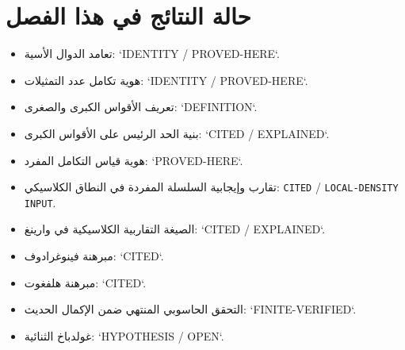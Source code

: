 \section*{حالة النتائج في هذا الفصل}

\begin{itemize}
\item تعامد الدوال الأسية: `IDENTITY / PROVED-HERE`.
\item هوية تكامل عدد التمثيلات: `IDENTITY / PROVED-HERE`.
\item تعريف الأقواس الكبرى والصغرى: `DEFINITION`.
\item بنية الحد الرئيس على الأقواس الكبرى: `CITED / EXPLAINED`.
\item هوية قياس التكامل المفرد: `PROVED-HERE`.
\item تقارب وإيجابية السلسلة المفردة في النطاق الكلاسيكي: \textenglish{\texttt{CITED}} / \textenglish{\texttt{LOCAL-DENSITY}} \textenglish{\texttt{INPUT}}.
\item الصيغة التقاربية الكلاسيكية في وارينغ: `CITED / EXPLAINED`.
\item مبرهنة فينوغرادوف: `CITED`.
\item مبرهنة هلفغوت: `CITED`.
\item التحقق الحاسوبي المنتهي ضمن الإكمال الحديث: `FINITE-VERIFIED`.
\item غولدباخ الثنائية: `HYPOTHESIS / OPEN`.
\end{itemize}
